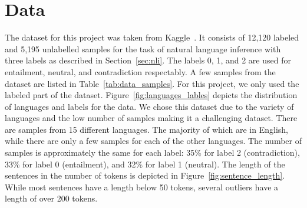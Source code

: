 \documentclass[acmsmall,nonacm]{acmart}
\begin{document}
\section{Data}
The dataset for this project was taken from Kaggle~\cite{kaggle-dataset}. 
It consists of 12,120 labeled and 5,195 unlabelled samples for the task of natural language inference with three labels as described in Section~\ref{sec:nli}. The labels 0, 1, and 2 are used for entailment, neutral, and contradiction respectably. 
A few samples from the dataset are listed in Table~\ref{tab:data_samples}.
For this project, we only used the labeled part of the dataset. Figure~\ref{fig:languages_lables} depicts the distribution of languages and labels for the data. We chose this dataset due to the variety of languages and the low number of samples making it a challenging dataset. There are samples from 15 different languages. The majority of which are in English, while there are only a few samples for each of the other languages. The number of samples is approximately the same for each label: 35\% for label 2 (contradiction), 33\% for label 0 (entailment), and 32\% for label 1 (neutral).
The length of the sentences in the number of tokens is depicted in Figure~\ref{fig:sentence_length}. While most sentences have a length below 50 tokens, several outliers have a length of over 200 tokens.

\begin{table}[]
  \caption{Examples taken from the labelled part of the dataset~\cite{kaggle-dataset} used for this project.}
  \label{tab:data_samples}
  \end{table}
\end{document}
